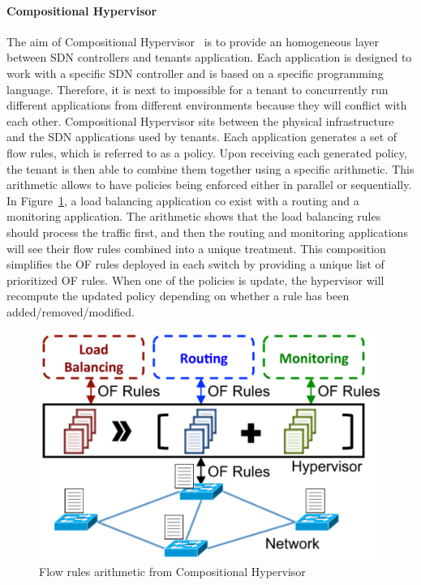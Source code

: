 \paragraph{Compositional Hypervisor}
The aim of Compositional Hypervisor~\cite{CompositionalHypervisor-Jin2014} is to provide an homogeneous layer between SDN controllers and tenants application.
Each application is designed to work with a specific SDN controller and is based on a specific programming language. Therefore, it is next to impossible for a tenant to concurrently run different applications from different environments because they will conflict with each other. Compositional Hypervisor sits between the physical infrastructure and the SDN applications used by tenants.
Each application generates a set of flow rules, which is referred to as a policy.
Upon receiving each generated policy, the tenant is then able to combine them together using a specific arithmetic.
This arithmetic allows to have policies being enforced either in parallel or sequentially. 
In Figure~\ref{fig:compositional-hyp}, a load balancing application co exist with a routing and a monitoring application. The arithmetic shows that the load balancing rules should process the traffic first, and then the routing and monitoring applications will see their flow rules combined into a unique treatment.
This composition simplifies the OF rules deployed in each switch by providing a unique list of prioritized OF rules. When one of the policies is update, the hypervisor will recompute the updated policy depending on whether a rule has been added/removed/modified.

\begin{figure}[ht]
    \centering
    \includegraphics[scale=0.7]{figures/compositional-structure.pdf}
    \caption{Flow rules arithmetic from Compositional Hypervisor~\cite{CompositionalHypervisor-Jin2014}}
    \label{fig:compositional-hyp}
\end{figure}

